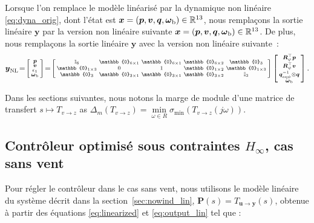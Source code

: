 Lorsque l'on remplace le modèle linéarisé par la dynamique non linéaire \eqref{eq:dyna_orig}, dont l'état est $\boldsymbol{x} = (\boldsymbol{p}, \boldsymbol{v}, \boldsymbol{q},\boldsymbol{\omega}_{\text{b}}) \in {\mathbb R}^{13} $,
nous remplaçons la sortie linéaire $\boldsymbol{y}$ par la version non linéaire suivante $\boldsymbol{x} = (\boldsymbol{p}, \boldsymbol{v},\boldsymbol{q},\boldsymbol{\omega}_{\text{b}}) \in {\mathbb R}^{13} $. 
De plus, nous remplaçons la sortie linéaire $\boldsymbol{y}$ avec la version non linéaire suivante :
\begin{align}
\label{eq:output}
    \boldsymbol{y}_{\text{NL}} \!=\! \smallmat{\boldsymbol{p}\\
     \boldsymbol{v}\\
     \epsilon_{1}\\
     \boldsymbol{\omega}_{\text{b}}} \!=\! \left[ \begin{smallmatrix} \mathbb{I}_{6} & \mathbb{0}_{6\times 1} & \mathbb{0}_{6\times 1} & \mathbb{0}_{6\times 2} & \mathbb{0}_{3}\\
     \mathbb{0}_{1\times 3} & 0 & 1 & \mathbb{0}_{1\times 2} & \mathbb{0}_{1 \times 3} \\
         \mathbb{0}_{3} & \mathbb{0}_{3\times 1} & \mathbb{0}_{3\times 1} & \mathbb{0}_{3\times 2} &   \mathbb{I}_{3}
         \end{smallmatrix} \right]
         \smallmat{\boldsymbol{R}^\top_{\psi}\boldsymbol{p} \\ \boldsymbol{R}^\top_{\psi}\boldsymbol{v} \\
\boldsymbol{q}_{\mathrm{eq}\psi}^{-1} \otimes \boldsymbol{q} \\
         \boldsymbol{\omega}_{\text{b}}  }.
\end{align}


Dans les sections suivantes, nous notons la marge de module d'une matrice de transfert $s \mapsto T_{v \rightarrow z}$ as $\Delta_m(T_{v \rightarrow z}) = \min\limits_{\omega\in R} \sigma_{\min}(T_{v \rightarrow z}(j\omega))$.



\subsection{Contrôleur optimisé sous contraintes $H_{\infty}$, cas sans vent}
\label{sec:zerowind}

Pour régler le contrôleur dans le cas sans vent, nous utilisons le modèle linéaire du système décrit dans la section~\ref{sec:nowind_lin}, $\boldsymbol{P}(s) = T_{\boldsymbol{u} \rightarrow \boldsymbol{y}}(s)$, obtenue à partir des équations \eqref{eq:linearized} et \eqref{eq:output_lin} tel que :

